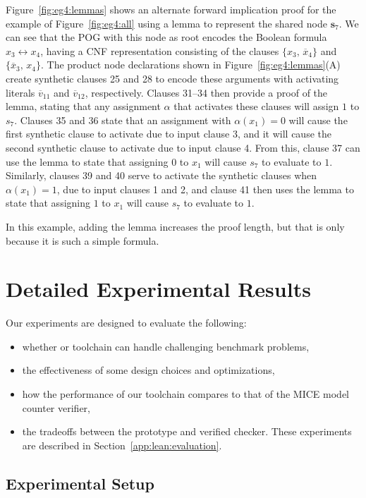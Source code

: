 \documentclass[letterpaper,USenglish,cleveref, autoref, thm-restate]{lipics-v2021}
\newcommand{\obar}[1]{\overline{#1}}
\newcommand{\assign}{\alpha}
\newcommand{\makenode}[1]{\mathbf{#1}}
\newcommand{\nodes}{\makenode{s}}
\begin{document}
Figure~\ref{fig:eg4:lemmas} shows an alternate forward implication
proof for the example of Figure~\ref{fig:eg4:all} using a lemma to
represent the shared node $\nodes_7$.  We can see that the POG with
this node as root encodes the Boolean formula $x_3 \leftrightarrow x_4$, having a CNF representation consisting of the clauses
$\{x_3 ,\, \obar{x}_4\}$ and $\{\obar{x}_3 ,\, {x}_4\}$.  The product node
declarations shown in Figure~\ref{fig:eg4:lemmas}(A) create synthetic
clauses 25 and 28 to encode these arguments with activating literals
$\obar{v}_{11}$ and $\obar{v}_{12}$, respectively.  Clauses 31--34
then provide a proof of the lemma, stating that any assignment
$\assign$ that activates these clauses will  assign $1$ to $s_7$.
Clauses 35 and 36 state that an assignment with $\assign(x_1) = 0$
will cause the first synthetic clause to activate due to input clause
3, and it will cause the second synthetic clause to activate due to
input clause 4.  From this, clause 37 can use the lemma to state that
assigning $0$ to $x_1$ will cause $s_7$ to evaluate to $1$.  Similarly,
clauses 39 and 40 serve to activate the synthetic clauses when
$\assign(x_1) = 1$, due to input clauses 1 and 2, and clause 41 then
uses the lemma to state that assigning $1$ to $x_1$ will cause $s_7$ to
evaluate to $1$.

In this example, adding the lemma increases the proof length, but that
is only because it is such a simple formula.




\section{Detailed Experimental Results}
\label{app:experiments}

Our experiments are designed to evaluate the following:
\begin{itemize}
\item
  whether or toolchain can handle challenging benchmark problems,
\item  
the effectiveness of some design choices and optimizations,
\item
how the performance of our toolchain compares to that of the MICE model counter verifier,
\item
the tradeoffs between the prototype and verified checker.  These experiments are described in Section~\ref{app:lean:evaluation}.
\end{itemize}

\subsection{Experimental Setup}
\end{document}
